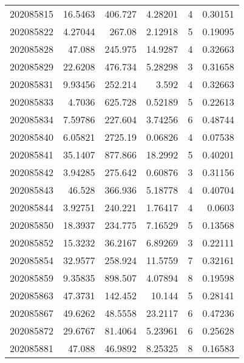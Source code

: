 \begin{tabular}{rrrrrr}
 202085815 &         16.5463  &      406.727  &            4.28201 &           4 & 0.30151 \\
 202085822 &          4.27044 &      267.08   &            2.12918 &           5 & 0.19095 \\
 202085828 &         47.088   &      245.975  &           14.9287  &           4 & 0.32663 \\
 202085829 &         22.6208  &      476.734  &            5.28298 &           3 & 0.31658 \\
 202085831 &          9.93456 &      252.214  &            3.592   &           4 & 0.32663 \\
 202085833 &          4.7036  &      625.728  &            0.52189 &           5 & 0.22613 \\
 202085834 &          7.59786 &      227.604  &            3.74256 &           6 & 0.48744 \\
 202085840 &          6.05821 &     2725.19   &            0.06826 &           4 & 0.07538 \\
 202085841 &         35.1407  &      877.866  &           18.2992  &           5 & 0.40201 \\
 202085842 &          3.94285 &      275.642  &            0.60876 &           3 & 0.31156 \\
 202085843 &         46.528   &      366.936  &            5.18778 &           4 & 0.40704 \\
 202085844 &          3.92751 &      240.221  &            1.76417 &           4 & 0.0603  \\
 202085850 &         18.3937  &      234.775  &            7.16529 &           5 & 0.13568 \\
 202085852 &         15.3232  &       36.2167 &            6.89269 &           3 & 0.22111 \\
 202085854 &         32.9577  &      258.924  &           11.5759  &           7 & 0.32161 \\
 202085859 &          9.35835 &      898.507  &            4.07894 &           8 & 0.19598 \\
 202085863 &         47.3731  &      142.452  &           10.144   &           5 & 0.28141 \\
 202085867 &         49.6262  &       48.5558 &           23.2117  &           6 & 0.47236 \\
 202085872 &         29.6767  &       81.4064 &            5.23961 &           6 & 0.25628 \\
 202085881 &         47.088   &       46.9892 &            8.25325 &           8 & 0.16583 \\

\end{tabular}
